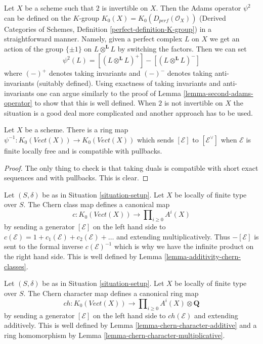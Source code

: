 \begin{remark}
\label{remark-adams-derived}
Let $X$ be a scheme such that $2$ is invertible on $X$.
Then the Adams operator $\psi^2$ can be defined on the $K$-group
$K_0(X) = K_0(D_{perf}(\mathcal{O}_X))$
(Derived Categories of Schemes, Definition \ref{perfect-definition-K-group})
in a straightforward manner.
Namely, given a perfect complex $L$ on $X$ we get an action
of the group $\{\pm 1\}$ on $L \otimes^\mathbf{L} L$ by switching
the factors. Then we can set
$$
\psi^2(L) = [(L \otimes^\mathbf{L} L)^+] -
[(L \otimes^\mathbf{L} L)^-]
$$
where $(-)^+$ denotes taking invariants and $(-)^-$ denotes taking
anti-invariants (suitably defined).
Using exactness of taking invariants and anti-invariants one can
argue similarly to the proof of Lemma \ref{lemma-second-adams-operator}
to show that this is well defined.
When $2$ is not invertible on $X$ the situation is a good deal more
complicated and another approach has to be used.
\end{remark}

\begin{lemma}
\label{lemma-minus-adams-operator}
Let $X$ be a scheme. There is a ring map
$\psi^{-1} : K_0(\textit{Vect}(X)) \to K_0(\textit{Vect}(X))$
which sends $[\mathcal{E}]$ to $[\mathcal{E}^\vee]$
when $\mathcal{E}$ is finite locally free
and is compatible with pullbacks.
\end{lemma}

\begin{proof}
The only thing to check is that taking duals is compatible with
short exact sequences and with pullbacks. This is clear.
\end{proof}

\begin{remark}
\label{remark-chern-classes-K}
Let $(S, \delta)$ be as in Situation \ref{situation-setup}.
Let $X$ be locally of finite type over $S$. The Chern class
map defines a canonical map
$$
c : K_0(\textit{Vect}(X)) \longrightarrow \prod\nolimits_{i \geq 0} A^i(X)
$$
by sending a generator $[\mathcal{E}]$ on the left hand side to
$c(\mathcal{E}) = 1 + c_1(\mathcal{E}) + c_2(\mathcal{E}) + \ldots$
and extending multiplicatively. Thus $-[\mathcal{E}]$ is sent to
the formal inverse $c(\mathcal{E})^{-1}$ which is why we have the
infinite product on the right hand side. This is well defined by
Lemma \ref{lemma-additivity-chern-classes}.
\end{remark}

\begin{remark}
\label{remark-chern-character-K}
Let $(S, \delta)$ be as in Situation \ref{situation-setup}.
Let $X$ be locally of finite type over $S$. The Chern character
map defines a canonical ring map
$$
ch : K_0(\textit{Vect}(X)) \longrightarrow
\prod\nolimits_{i \geq 0} A^i(X) \otimes \mathbf{Q}
$$
by sending a generator $[\mathcal{E}]$ on the left hand side to
$ch(\mathcal{E})$ and extending additively. This is well defined
by Lemma \ref{lemma-chern-character-additive} and a ring homomorphism by
Lemma \ref{lemma-chern-character-multiplicative}.
\end{remark}

